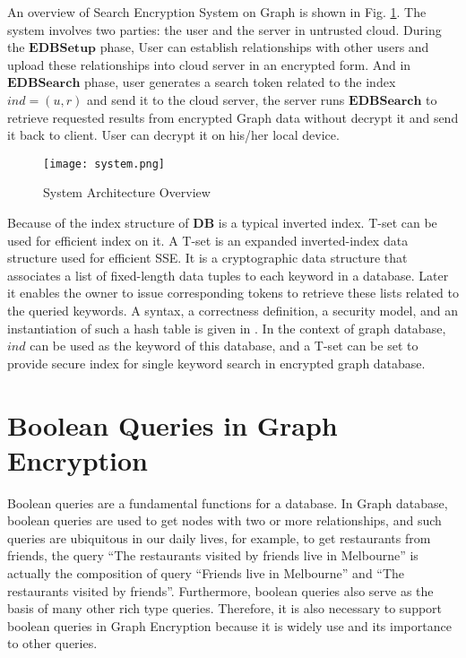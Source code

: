 An overview of Search Encryption System on Graph is shown in Fig. \ref{fig:system}. The system involves two parties: the user and the server in untrusted cloud. During the $\mathbf{EDBSetup}$ phase, User can establish relationships with other users and upload these relationships into cloud server in an encrypted form. And in $\mathbf{EDBSearch}$ phase, user generates a search token related to the index $ind = (u, r)$ and send it to the cloud server, the server runs $\mathbf{EDBSearch}$ to retrieve requested results from encrypted Graph data without decrypt it and send it back to client. User can decrypt it on his/her local device.
\begin{figure}[h]
\texttt{[image: system.png]}
\caption{System Architecture Overview}
\label{fig:system}
\end{figure}

Because of the index structure of $\mathbf{DB}$ is a typical inverted index. T-set can be used for efficient index on it. A T-set is an expanded inverted-index data structure \cite{cash2013highly} used for efficient SSE. It is a cryptographic data structure that associates a list of fixed-length data tuples to each keyword in a database. Later it enables the owner to issue corresponding tokens to retrieve these lists related to the queried keywords. A syntax, a correctness definition, a security model, and an instantiation of such a hash table is given in \cite{cash2013highly}. In the context of graph database, $ind$ can be used as the keyword of this database, and a T-set can be set to provide secure index for single keyword search in encrypted graph database.

\section{Boolean Queries in Graph Encryption}
Boolean queries are a fundamental functions for a database. In Graph database, boolean queries are used to get nodes with two or more relationships, and such queries are ubiquitous in our daily lives, for example, to get restaurants from friends, the query ``The restaurants visited by friends live in Melbourne'' is actually the composition of query ``Friends live in Melbourne'' and ``The restaurants visited by friends''. Furthermore, boolean queries also serve as the basis of many other rich type queries. Therefore, it is also necessary to support boolean queries in Graph Encryption because it is widely use and its importance to other queries.

